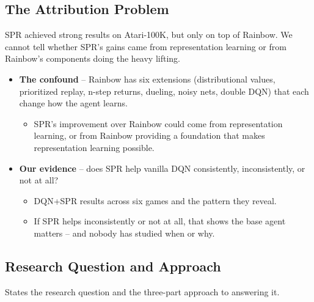 \documentclass[11pt]{article}
\begin{document}
\subsection{The Attribution Problem}

\noindent SPR achieved strong results on Atari-100K, but only on top
of Rainbow. We cannot tell whether SPR's gains came from representation
learning or from Rainbow's components doing the heavy lifting.

\begin{itemize}
\item \textbf{The confound} -- Rainbow has six extensions (distributional
  values, prioritized replay, n-step returns, dueling, noisy nets,
  double DQN) that each change how the agent learns.
  \begin{itemize}[label=$\circ$, itemsep=0.2em, parsep=0pt, topsep=0pt, partopsep=0pt]
  \item SPR's improvement over Rainbow could come from representation
    learning, or from Rainbow providing a foundation that makes
    representation learning possible.
  \end{itemize}
\item \textbf{Our evidence} -- does SPR help vanilla DQN consistently,
  inconsistently, or not at all?
  \begin{itemize}[label=$\circ$, itemsep=0.2em, parsep=0pt, topsep=0pt, partopsep=0pt]
  \item DQN+SPR results across six games and the pattern they reveal.
  \item If SPR helps inconsistently or not at all, that shows
    the base agent matters -- and nobody has studied when or why.
  \end{itemize}
\end{itemize}

\subsection{Research Question and Approach}

\noindent States the research question and the three-part approach to
answering it.
\end{document}
